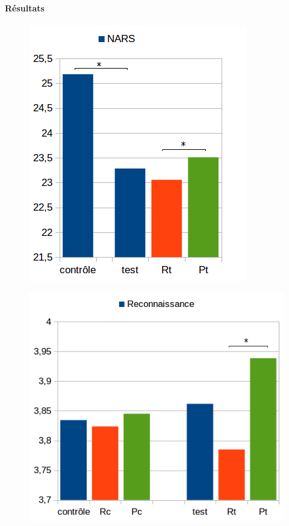         \paragraph{Résultats}
            \begin{figure}[!h]
            \begin{minipage}{0.425\linewidth}
                \centering
                \includegraphics[width=.9\linewidth]{Figures/Desprez-nars-name_for_bot.png}
                \label{fig:result-nars-name_for_bot}
            \end{minipage}
            \begin{minipage}{0.55\linewidth}
                \centering
                \includegraphics[width=.9\linewidth]{Figures/Desprez-BR-name_for_bot.png}

\end{minipage}
\end{figure}

